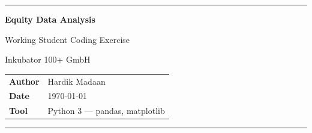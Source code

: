 \documentclass[
	english,				%
	ruledheaders=all,		%
	class=report,			%
	thesis={type=},	%
	accentcolor=1a,			%
	custommargins=geometry,	%
	marginpar=false,		%
	parskip=half-,			%
	fontsize=11pt,			%
	captions=oneline,		%
	numbers=noenddot,		%
	pdfa=true,				%
	logofile=image,		%
]{tudapub}
\begin{document}

\begin{titlepage}

{\color{accentblue}\rule{\linewidth}{3pt}}

\vspace{28mm}

{\sffamily\fontsize{26}{32}\selectfont\textbf{Equity Data Analysis}\par}
\vspace{4mm}
{\sffamily\fontsize{18}{24}\selectfont\color{accentblue} Working Student Coding Exercise\par}

\vspace{12mm}
{\sffamily\large Inkubator 100+ GmbH\par}

\vfill

\begin{tabular}{@{}ll}
  \sffamily\textbf{Author}  & \sffamily Hardik Madaan \\
  \sffamily\textbf{Date}    & \sffamily \today \\
  \sffamily\textbf{Tool}    & \sffamily Python 3 --- pandas, matplotlib \\
\end{tabular}

\vspace{8mm}
{\color{accentblue}\rule{\linewidth}{3pt}}

\restoregeometry
\end{titlepage}


\frontmatter

\tableofcontents
\clearpage

\mainmatter






\printbibliography[heading=bibintoc, title={References}]

\listoffigures
\listoftables
\lstlistoflistings
\end{document}
